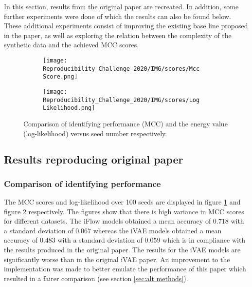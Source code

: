 In this section, results from the original paper are recreated. In addition, some further experiments were done of which the results can also be found below. These additional experiments consist of improving the existing base line proposed in the paper, as well as exploring the relation between the complexity of the synthetic data and the achieved MCC scores.

\begin{figure}[ht] 
  \begin{subfigure}[b]{0.5\linewidth}
    \centering
    \texttt{[image: Reproducibility\_Challenge\_2020/IMG/scores/Mcc Score.png]}
    \caption{} 
    \label{fig:MCCscores:a} 
  \end{subfigure}%
  \begin{subfigure}[b]{0.5\linewidth}
    \centering
    \texttt{[image: Reproducibility\_Challenge\_2020/IMG/scores/Log Likelihood.png]} 
    \caption{} 
    \label{fig:MCCscores:b} 
  \end{subfigure} 
  \caption{Comparison of identifying performance (MCC) and the energy value (log-likelihood) versus seed number respectively.}
  \label{fig:MCCscores}
\end{figure}

\subsection{Results reproducing original paper}

\subsubsection{Comparison of identifying performance}
The MCC scores and log-likelihood over 100 seeds are displayed in figure \ref{fig:MCCscores:a} and figure \ref{fig:MCCscores:b} respectively. The figures show that there is high variance in MCC scores for different datasets. The iFlow models obtained a mean accuracy of $0.718$ with a standard deviation of $0.067$ whereas the iVAE models obtained a mean accuracy of $0.483$ with a standard deviation of $0.059$ which is in compliance with the results produced in the original paper. The results for the iVAE models are significantly worse than in the original iVAE paper. An improvement to the implementation was made to better emulate the performance of this paper which resulted in a fairer comparison (see section \ref{sec:alt methods}). 


